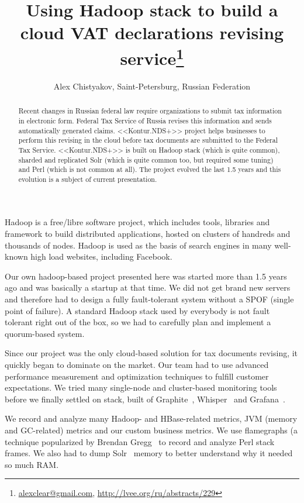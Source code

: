 \documentclass[10pt, a5paper]{article}
\begin{document}
\title{Using Hadoop stack to build a cloud VAT declarations revising service\footnote{\url{alexclear@gmail.com}, \url{http://lvee.org/ru/abstracts/229}}}
\author{Alex Chistyakov, Saint-Petersburg, Russian Federation}
\maketitle
\begin{abstract}
Recent changes in Russian federal law require organizations to submit tax information in electronic form. Federal Tax Service of Russia revises this information and sends automatically \linebreak generated claims. <<Kontur.NDS+>> project helps businesses to perform this revising in the cloud before tax documents are submitted to the Federal Tax Service. <<Kontur.NDS+>> is built on Hadoop stack (which is quite common), sharded and replicated Solr (which is quite common too, but required some tuning) and Perl (which is not common at all). The project evolved the last 1.5 years and this evolution is a subject of current presentation.
\end{abstract}
Hadoop is a free/libre software project, which includes tools, libraries and framework to build distributed applications, hosted on clusters of handreds and thousands of nodes. Hadoop is used as the basis of search engines in many well-known high load websites, including Facebook.

Our own hadoop-based project presented here was started more than 1.5 years ago and was basically a startup at that time. We did not get brand new servers and therefore had to design a fully fault-tolerant system without a SPOF (single point of failure). A standard Hadoop stack used by everybody is not fault tolerant right out of the box, so we had to carefully plan and implement a quorum-based system.

Since our project was the only cloud-based solution for tax \linebreak documents  revising, it quickly began to dominate on the market. Our team had to use advanced performance measurement and optimization techniques to fulfill customer expectations. We tried many single-node and cluster-based monitoring tools before we finally settled on stack, built of Graphite~\cite{Chistyakov1}, Whisper~\cite{Chistyakov2} and Grafana~\cite{Chistyakov3}.

We record and analyze many Hadoop- and HBase-related metrics, JVM (memory and GC-related) metrics and our custom business \linebreak metrics. We use flamegraphs (a technique popularized by Brendan \linebreak Gregg~\cite{Chistyakov4} to record and analyze Perl stack frames. We also had to dump Solr~\cite{Chistyakov5} memory to better understand why it needed so much RAM.
\end{document}
